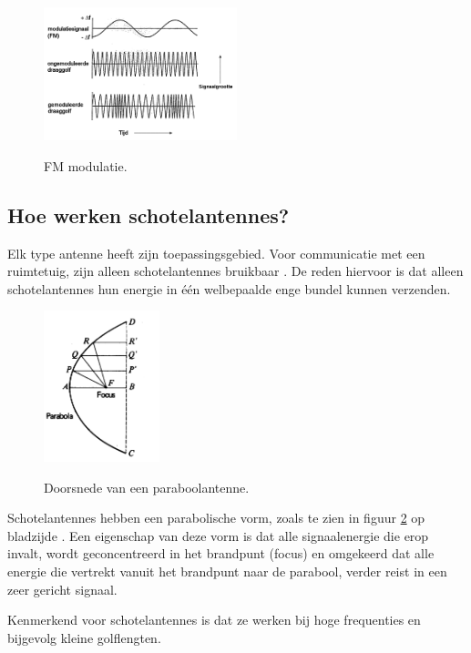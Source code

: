 \begin{figure}[ht]
  \centering
  \includegraphics[width=0.5\textwidth]{voorbeeld_figuren/FMwit}
  \caption{FM modulatie.} 
  \cite{FM}
  \label{fig:FM}
\end{figure}


\subsection{Hoe werken schotelantennes?}

Elk type antenne heeft zijn toepassingsgebied. Voor communicatie met een ruimtetuig, zijn alleen schotelantennes bruikbaar \cite{kennedy}. De reden hiervoor is dat alleen schotelantennes hun energie in één welbepaalde enge bundel kunnen verzenden.

\begin{figure}[ht]
  \centering
  \includegraphics[width=0.3\textwidth]{voorbeeld_figuren/paraboolantenne_doorsnede}
  \caption{Doorsnede van een paraboolantenne.} 
  \cite{kennedy}
  \label{fig:parabool}
\end{figure}

Schotelantennes hebben een parabolische vorm, zoals te zien in figuur \ref{fig:parabool} op bladzijde \pageref{fig:parabool}. Een eigenschap van deze vorm is dat alle signaalenergie die erop invalt, wordt geconcentreerd in het brandpunt (focus) en omgekeerd dat alle energie die vertrekt vanuit het brandpunt naar de parabool, verder reist in een zeer gericht signaal. 

Kenmerkend voor schotelantennes is dat ze werken bij hoge frequenties en bijgevolg kleine golflengten.

